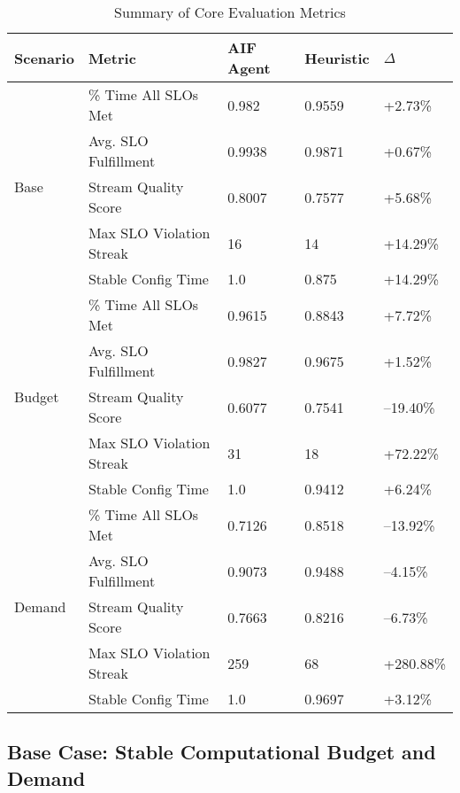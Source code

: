 \begin{table}[h!]
\centering
\caption{Summary of Core Evaluation Metrics}
\label{tab:results_summary}
\begin{tabular}{@{}lllll@{}}
\toprule
\textbf{Scenario} & \textbf{Metric} & \textbf{AIF Agent} & \textbf{Heuristic} & \textbf{$\Delta$} \\
\midrule
\multirow{5}{*}{Base} 
& \% Time All SLOs Met & 0.982 & 0.9559 & +2.73\% \\
& Avg. SLO Fulfillment & 0.9938 & 0.9871 & +0.67\% \\
& Stream Quality Score & 0.8007 & 0.7577 & +5.68\% \\
& Max SLO Violation Streak & 16 & 14 & +14.29\% \\
& Stable Config Time & 1.0 & 0.875 & +14.29\% \\
\midrule
\multirow{5}{*}{Budget} 
& \% Time All SLOs Met & 0.9615 & 0.8843 & +7.72\% \\
& Avg. SLO Fulfillment & 0.9827 & 0.9675 & +1.52\% \\
& Stream Quality Score & 0.6077 & 0.7541 & --19.40\% \\
& Max SLO Violation Streak & 31 & 18 & +72.22\% \\
& Stable Config Time & 1.0 & 0.9412 & +6.24\% \\
\midrule
\multirow{5}{*}{Demand} 
& \% Time All SLOs Met & 0.7126 & 0.8518 & --13.92\% \\
& Avg. SLO Fulfillment & 0.9073 & 0.9488 & --4.15\% \\
& Stream Quality Score & 0.7663 & 0.8216 & --6.73\% \\
& Max SLO Violation Streak & 259 & 68 & +280.88\% \\
& Stable Config Time & 1.0 & 0.9697 & +3.12\% \\
\bottomrule
\end{tabular}
\end{table}



\subsection{Base Case: Stable Computational Budget and Demand}

